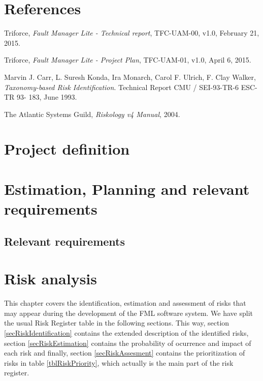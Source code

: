 \documentclass[11pt]{report}
\newcounter{risks}[subsection]
\begin{document}
\chapter{References}
\label{chapReferences}
\let\oldchapter\chapter
\renewcommand{\chapter}[2]{}
\begin{thebibliography}{9}
	Triforce,
	\emph{Fault Manager Lite - Technical report},
	TFC-UAM-00,
	v1.0,
	February 21, 2015.

	Triforce,
	\emph{Fault Manager Lite - Project Plan},
	TFC-UAM-01,
	v1.0,
	April 6, 2015.

	Marvin J. Carr, L. Suresh Konda, Ira Monarch, Carol F. Ulrich, F. Clay Walker,
	\emph{Taxonomy-based Risk Identification}.
	Technical Report CMU / SEI-93-TR-6 ESC-TR 93- 183,
	June 1993.

	The Atlantic Systems Guild,
	\emph{Riskology v4 Manual},
	2004.

\end{thebibliography}
\let\chapter\oldchapter

\chapter{Project definition}
\label{chapDef}


\chapter{Estimation, Planning and relevant requirements}
\label{chapPlan}


\newpage
\section{Relevant requirements}


\chapter{Risk analysis}
\label{chapRiskAnalysis}
This chapter covers the identification, estimation and assessment of risks that may appear during the development of the FML software system. We have split the usual Risk Register table in the following sections. This way, section \ref{secRiskIdentification} contains the extended description of the identified risks, section \ref{secRiskEstimation} contains the probability of ocurrence and impact of each risk and finally, section \ref{secRiskAssesment} contains the prioritization of risks in table \ref{tblRiskPriority}, which actually is the main part of the risk register.
\end{document}
